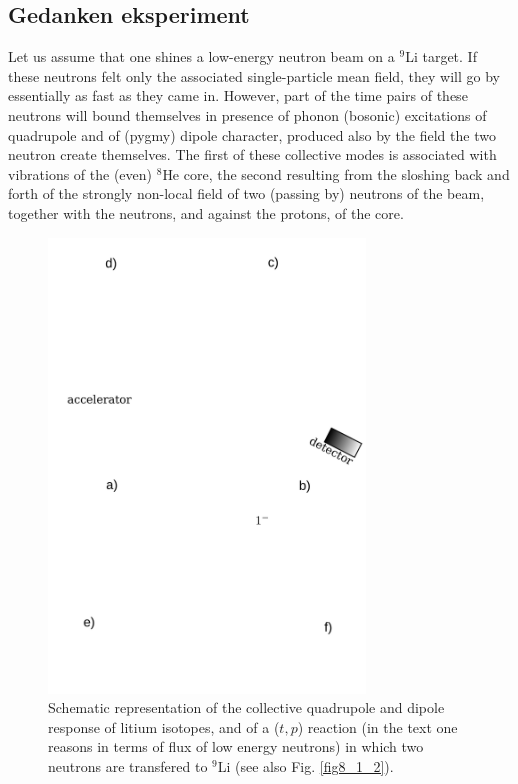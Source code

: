 \begin{subappendices}
\subsection{Gedanken eksperiment}
Let us assume that one shines a  low-energy neutron beam on a $^{9}$Li target. If these neutrons felt only the associated single-particle mean field, they will go by essentially as fast as they came in.  However,  part of the time pairs of these neutrons will bound themselves in  presence of phonon (bosonic) excitations of quadrupole and of (pygmy) dipole character, produced also by the field the two neutron create themselves. The first of these collective modes is  associated with vibrations of the (even) $^{8}$He core, the second resulting from the sloshing back and forth of the strongly non-local field of two (passing by) neutrons of the beam, together with the neutrons, and against the protons, of the core.
\begin{figure}[h!]
	\begin{center}
		\includegraphics[width=0.75\textwidth]{C8/figsC8/BootStrap_Li}
	\end{center}
	\caption{Schematic representation of the collective quadrupole and dipole response of litium isotopes, and of a ($t,p$) reaction (in the text one reasons in terms of flux of low energy neutrons) in which two neutrons are transfered to $^9$Li (see also Fig. \ref{fig8_1_2}).}

\end{figure}
\end{subappendices}
